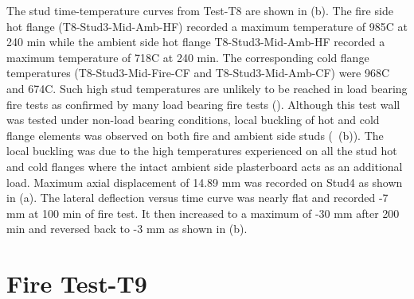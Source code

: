 The stud time-temperature curves from Test-T8 are shown in  (b). The fire side hot flange (T8-Stud3-Mid-Amb-HF) recorded a maximum temperature of 985\degree C at 240 min while the ambient side hot flange T8-Stud3-Mid-Amb-HF recorded a maximum temperature of 718\degree C at 240 min. The corresponding cold flange temperatures (T8-Stud3-Mid-Fire-CF and T8-Stud3-Mid-Amb-CF) were 968\degree C and 674\degree C. Such high stud temperatures are unlikely to be reached in load bearing fire tests as confirmed by many load bearing fire tests (\citet{Feng2005,Chen2012a,Kodur2013,Magarabooshanam2019}). Although this test wall was tested under non-load bearing conditions, local buckling of hot and cold flange elements was observed on both fire and ambient side studs (~(b)). The local buckling was due to the high temperatures experienced on all the stud hot and cold flanges where the intact ambient side plasterboard acts as an additional load. Maximum axial displacement of 14.89 mm was recorded on Stud4 as shown in  (a). The lateral deflection versus time curve was nearly flat and recorded -7 mm at 100 min of fire test. It then increased to a maximum of -30 mm after 200 min and reversed back to -3 mm as shown in  (b).

\section{Fire Test-T9}

